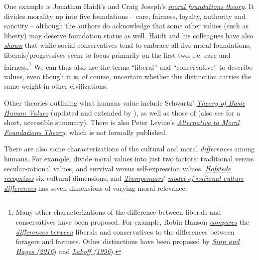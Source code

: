 One example is Jonathan Haidt's and Craig Joseph's
\href{https://en.wikipedia.org/wiki/Moral_foundations_theory}{\emph{moral
foundations theory}}. It divides morality up into five foundations --
care, fairness, loyalty, authority and sanctity -- although the authors
do acknowledge that some other values (such as liberty) may deserve
foundation status as well. Haidt and his colleagues have also
\href{https://en.wikipedia.org/wiki/Moral_foundations_theory\#Political_ideology}{\emph{shown}}
that while social conservatives tend to embrace all five moral
foundations, liberals/progressives seem to focus primarily on the first
two, i.e. care and fairness.\footnote{Many other characterizations of
  the difference between liberals and conservatives have been proposed.
  For example, Robin Hanson
  \href{http://www.overcomingbias.com/2012/05/forager-vs-farmer-morality.html}{\emph{compares}}
  the
  \href{http://www.overcomingbias.com/2010/10/two-types-of-people.html}{\emph{differences
  between}} liberals and conservatives to the differences between
  foragers and farmers. Other distinctions have been proposed by
  \href{https://sl4librarian.files.wordpress.com/2017/01/sinn2016-replacing-the-moral-foundations.pdf}{\emph{Sinn
  and Hayes (2016}}) and
  \href{https://en.wikipedia.org/wiki/Moral_Politics_(book)}{\emph{Lakoff
  (1996}}).} We can thus also use the terms ``liberal'' and
``conservative'' to describe values, even though it is, of course,
uncertain whether this distinction carries the same weight in other
civilizations.

Other theories outlining what humans value include Schwartz'
\href{https://en.wikipedia.org/wiki/Theory_of_Basic_Human_Values}{\emph{Theory
of Basic Human Values}} (updated and extended by
\parencite{Schwartz2012-qi}), as well as those of
\parencite{Shweder1997-ge} (also see
\parencite{Pinker2011-el} for a short, accessible summary).
There is also Peter Levine's
\href{http://peterlevine.ws/?p=16998}{\emph{\emph{Alternative to Moral
Foundations Theory}}}, which is not formally published.

There are also some characterizations of the cultural and moral
\emph{differences} among humans. For example,
\parencite{Inglehart2010-qr} divide moral values into just
two factors: traditional versus secular-rational values, and survival
versus self-expression values.
\href{https://en.wikipedia.org/wiki/Geert_Hofstede}{\emph{Hofstede}}
\href{https://en.wikipedia.org/wiki/Hofstede\%27s_cultural_dimensions_theory}{\emph{recognizes}}
six cultural dimensions, and
\href{https://en.wikipedia.org/wiki/Fons_Trompenaars}{\emph{Trompenaars}}'
\href{https://en.wikipedia.org/wiki/Trompenaars\%27_model_of_national_culture_differences}{\emph{model
of national culture differences}} has seven dimensions of varying moral
relevance.

